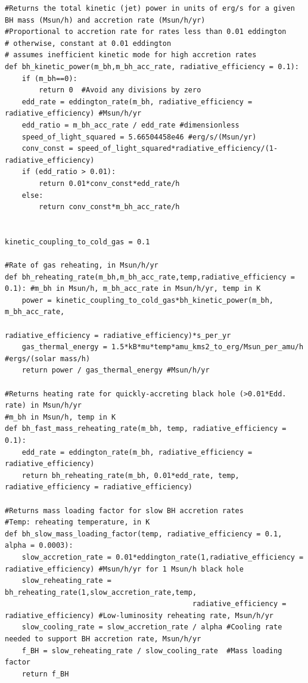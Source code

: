 \documentclass[onecolumn]{aastex62}
\begin{document}
\begin{verbatim}
#Returns the total kinetic (jet) power in units of erg/s for a given BH mass (Msun/h) and accretion rate (Msun/h/yr)
#Proportional to accretion rate for rates less than 0.01 eddington
# otherwise, constant at 0.01 eddington
# assumes inefficient kinetic mode for high accretion rates
def bh_kinetic_power(m_bh,m_bh_acc_rate, radiative_efficiency = 0.1):
    if (m_bh==0):
        return 0  #Avoid any divisions by zero
    edd_rate = eddington_rate(m_bh, radiative_efficiency = radiative_efficiency) #Msun/h/yr
    edd_ratio = m_bh_acc_rate / edd_rate #dimensionless
    speed_of_light_squared = 5.66504458e46 #erg/s/(Msun/yr)
    conv_const = speed_of_light_squared*radiative_efficiency/(1-radiative_efficiency)
    if (edd_ratio > 0.01):
        return 0.01*conv_const*edd_rate/h
    else:
        return conv_const*m_bh_acc_rate/h
    

kinetic_coupling_to_cold_gas = 0.1

#Rate of gas reheating, in Msun/h/yr
def bh_reheating_rate(m_bh,m_bh_acc_rate,temp,radiative_efficiency = 0.1): #m_bh in Msun/h, m_bh_acc_rate in Msun/h/yr, temp in K
    power = kinetic_coupling_to_cold_gas*bh_kinetic_power(m_bh, m_bh_acc_rate,
                                                          radiative_efficiency = radiative_efficiency)*s_per_yr 
    gas_thermal_energy = 1.5*kB*mu*temp*amu_kms2_to_erg/Msun_per_amu/h #ergs/(solar mass/h)
    return power / gas_thermal_energy #Msun/h/yr

#Returns heating rate for quickly-accreting black hole (>0.01*Edd. rate) in Msun/h/yr
#m_bh in Msun/h, temp in K
def bh_fast_mass_reheating_rate(m_bh, temp, radiative_efficiency = 0.1):
    edd_rate = eddington_rate(m_bh, radiative_efficiency = radiative_efficiency)
    return bh_reheating_rate(m_bh, 0.01*edd_rate, temp, radiative_efficiency = radiative_efficiency)

#Returns mass loading factor for slow BH accretion rates
#Temp: reheating temperature, in K
def bh_slow_mass_loading_factor(temp, radiative_efficiency = 0.1, alpha = 0.0003):
    slow_accretion_rate = 0.01*eddington_rate(1,radiative_efficiency = radiative_efficiency) #Msun/h/yr for 1 Msun/h black hole
    slow_reheating_rate = bh_reheating_rate(1,slow_accretion_rate,temp,
                                            radiative_efficiency = radiative_efficiency) #Low-luminosity reheating rate, Msun/h/yr
    slow_cooling_rate = slow_accretion_rate / alpha #Cooling rate needed to support BH accretion rate, Msun/h/yr
    f_BH = slow_reheating_rate / slow_cooling_rate  #Mass loading factor
    return f_BH


\end{verbatim}
\end{document}
